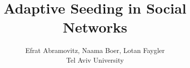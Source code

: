 \documentclass[tikz,dvipsnames]{vldb}
\begin{document}
\title{Adaptive Seeding in Social Networks}
\author{Efrat Abramovitz, Naama Boer, Lotan Faygler \\ Tel Aviv University}


 \\

\maketitle







\vspace{-1mm}
% 
% 








{\large

}
%
\end{document}
